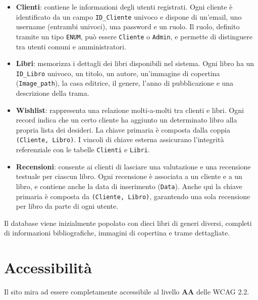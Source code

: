\documentclass{article}
\begin{document}
\begin{itemize}
    \item \textbf{Clienti}: contiene le informazioni degli utenti registrati. Ogni cliente è identificato da un campo \texttt{ID\_Cliente} univoco e dispone di un'email, uno username (entrambi univoci), una password e un ruolo. Il ruolo, definito tramite un tipo \texttt{ENUM}, può essere \texttt{Cliente} o \texttt{Admin}, e permette di distinguere tra utenti comuni e amministratori.
    
    \item \textbf{Libri}: memorizza i dettagli dei libri disponibili nel sistema. Ogni libro ha un \texttt{ID\_Libro} univoco, un titolo, un autore, un'immagine di copertina (\texttt{Image\_path}), la casa editrice, il genere, l'anno di pubblicazione e una descrizione della trama.
    
    \item \textbf{Wishlist}: rappresenta una relazione molti-a-molti tra clienti e libri. Ogni record indica che un certo cliente ha aggiunto un determinato libro alla propria lista dei desideri. La chiave primaria è composta dalla coppia \texttt{(Cliente, Libro)}. I vincoli di chiave esterna assicurano l'integrità referenziale con le tabelle \texttt{Clienti} e \texttt{Libri}.
    
    \item \textbf{Recensioni}: consente ai clienti di lasciare una valutazione e una recensione testuale per ciascun libro. Ogni recensione è associata a un cliente e a un libro, e contiene anche la data di inserimento (\texttt{Data}). Anche qui la chiave primaria è composta da \texttt{(Cliente, Libro)}, garantendo una sola recensione per libro da parte di ogni utente.
\end{itemize}

Il database viene inizialmente popolato con dieci libri di generi diversi, completi di informazioni bibliografiche, immagini di copertina e trame dettagliate.

\newpage
\section{Accessibilità}
Il sito mira ad essere completamente accessibile al livello \textbf{AA} delle WCAG 2.2. 
\end{document}
